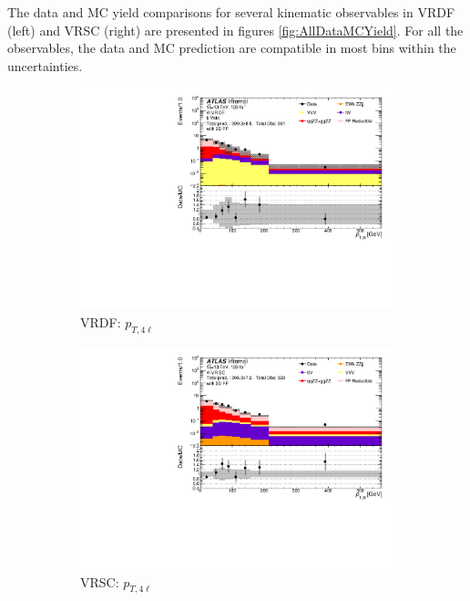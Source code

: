The data and MC yield comparisons for several kinematic observables in VRDF (left) and VRSC (right) are presented in figures \ref{fig:AllDataMCYield}. For all the observables, the data and MC prediction are compatible in most bins within the uncertainties.

\begin{figure}[htb]
	\centering
    \begin{subfigure}{.48\textwidth}
        \centering
        \includegraphics[width = 0.85\linewidth]{figures/Analysis/Background/Overlay_VRDF_FFApplied_Pt4l.pdf}
        \caption{VRDF: $p_{T,4\ell}$}
	\end{subfigure}
    \begin{subfigure}{.48\textwidth}
        \centering
        \includegraphics[width = 0.85\linewidth]{figures/Analysis/Background/Overlay_VRSC_FFApplied_Pt4l.pdf} 
        \caption{VRSC: $p_{T,4\ell}$} 
    \end{subfigure}\\
    \begin{subfigure}{.48\textwidth}

\end{subfigure}
\end{figure}
